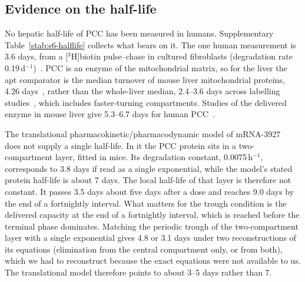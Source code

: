 \subsection{Evidence on the half-life}
\label{si:s6:halflife}

No hepatic half-life of PCC has been measured in humans. Supplementary
Table~\ref{stab:s6-halflife} collects what bears on it. The one human measurement is 3.6 days,
from a [$^{3}$H]biotin pulse--chase in cultured fibroblasts (degradation rate
0.19\,d$^{-1}$)~\cite{chandler1985}. PCC is an enzyme of the mitochondrial matrix, so for the liver
the apt comparator is the median turnover of mouse liver mitochondrial proteins, 4.26
days~\cite{kim2012}, rather than the whole-liver median, 2.4--3.6 days across labelling
studies~\cite{rolfs2021}, which includes faster-turning compartments. Studies of the
delivered enzyme in mouse liver give 5.3--6.7 days for human PCC~\cite{jiang2020dual}.

The translational pharmacokinetic/pharmacodynamic model of mRNA-3927~\cite{pkpd_translational}
does not supply a single half-life. In it the PCC protein sits in a two-compartment layer,
fitted in mice. Its degradation constant, 0.0075\,h$^{-1}$, corresponds to 3.8 days if read as
a single exponential, while the model's stated protein half-life is about 7 days. The local
half-life of that layer is therefore not constant. It passes 3.5 days about five days after a
dose and reaches 9.0 days by the end of a fortnightly interval. What matters for the trough
condition is the delivered capacity at the end of a fortnightly interval, which is reached
before the terminal phase dominates. Matching the periodic trough of the two-compartment layer
with a single exponential gives 4.8 or 3.1 days under two reconstructions of its equations
(elimination from the central compartment only, or from both), which we had to reconstruct
because the exact equations were not available to us. The translational model therefore points
to about 3--5 days rather than 7.

